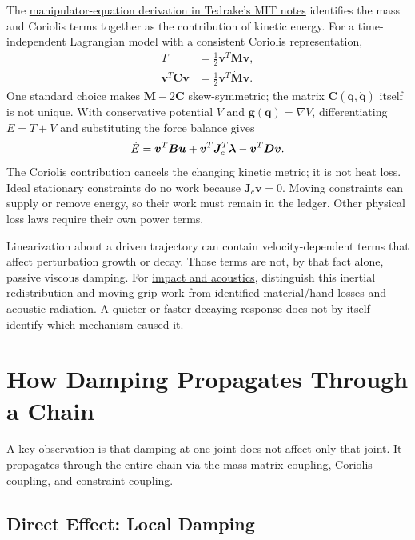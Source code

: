 The \href{https://underactuated.mit.edu/multibody.html\#the-manipulator-equations}{manipulator-equation derivation in Tedrake's MIT notes} identifies the mass and Coriolis terms together as the contribution of kinetic energy. For a time-independent Lagrangian model with a consistent Coriolis representation, \[
\begin{aligned}
T&=\tfrac12\bm v^T\bm M\bm v,\\
\bm v^T\bm C\bm v&=\tfrac12\bm v^T\dot{\bm M}\bm v.
\end{aligned}
\] One standard choice makes \(\dot{\bm M}-2\bm C\) skew-symmetric; the matrix \(\mathbf{C}(\mathbf{q},\dot{\mathbf{q}})\) itself is not unique. With conservative potential \(V\) and \(\mathbf{g}(\mathbf{q})=\nabla V\), differentiating \(E=T+V\) and substituting the force balance gives \[
\dot E=\bm v^T\bm B\bm{u}
+\bm v^T\bm J_c^T\boldsymbol{\lambda}
-\bm v^T\bm D\bm v.
\] The Coriolis contribution cancels the changing kinetic metric; it is not heat loss. Ideal stationary constraints do no work because \(\bm J_c\bm v=0\). Moving constraints can supply or remove energy, so their work must remain in the ledger. Other physical loss laws require their own power terms.

Linearization about a driven trajectory can contain velocity-dependent terms that affect perturbation growth or decay. Those terms are not, by that fact alone, passive viscous damping. For \href{https://affinedrift.com/articles/technology-heavy-hit-impact-coupling.html}{impact and acoustics}, distinguish this inertial redistribution and moving-grip work from identified material/hand losses and acoustic radiation. A quieter or faster-decaying response does not by itself identify which mechanism caused it. 

\section{How Damping Propagates Through a Chain}
\label{sec:propagation}


A key observation is that damping at one joint does not affect only that joint. It propagates through the entire chain via the mass matrix coupling, Coriolis coupling, and constraint coupling.

\subsection{Direct Effect: Local Damping}

